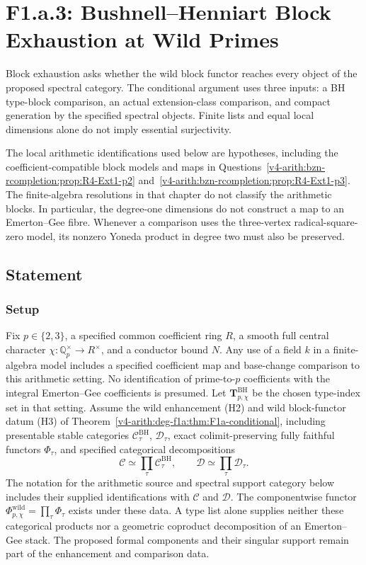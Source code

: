 \chapter{F1.a.3: Bushnell--Henniart Block Exhaustion at Wild Primes}
\label{v4-arith:f1a3-BH}

Block exhaustion asks whether the wild block functor reaches every
object of the proposed spectral category. The conditional argument
uses three inputs: a BH type-block comparison, an actual
extension-class comparison, and compact generation by the specified
spectral objects. Finite lists and equal local dimensions alone do
not imply essential surjectivity.

The local arithmetic identifications used below are hypotheses,
including the coefficient-compatible block models and maps in
Questions~\ref{v4-arith:bzn-rcompletion:prop:R4-Ext1-p2}
and~\ref{v4-arith:bzn-rcompletion:prop:R4-Ext1-p3}.
The finite-algebra resolutions in that chapter do not classify the
arithmetic blocks. In particular, the degree-one dimensions do not
construct a map to an Emerton--Gee fibre. Whenever a comparison
uses the three-vertex radical-square-zero model, its nonzero
Yoneda product in degree two must also be preserved.

\section{Statement}
\label{v4-arith:f1a3-BH:statement}

\subsection{Setup}

Fix \(p\in\{2,3\}\), a specified common coefficient ring \(R\),
a smooth full central character
\(\chi:\mathbb Q_p^\times\to R^\times\), and a conductor bound
\(N\). Any use of a field \(k\) in a finite-algebra model includes
a specified coefficient map and base-change comparison to this
arithmetic setting. No identification of prime-to-\(p\) coefficients
with the integral Emerton--Gee coefficients is presumed.
Let \(\mathbf T^{\mathrm{BH}}_{p,\chi}\) be the chosen type-index
set in that setting. Assume the wild enhancement (H2) and wild
block-functor datum (H3) of
Theorem~\ref{v4-arith:deg-f1a:thm:F1a-conditional}, including
presentable stable categories \(\mathcal C_\tau^{\mathrm{BH}}\),
\(\mathcal D_\tau\), exact colimit-preserving fully faithful
functors \(\Phi_\tau\), and specified categorical decompositions
\[
 \mathcal C\simeq\prod_\tau\mathcal C_\tau^{\mathrm{BH}},
 \qquad \mathcal D\simeq\prod_\tau\mathcal D_\tau.
\]
The notation for the arithmetic source and spectral support category
below includes their supplied identifications with \(\mathcal C\)
and \(\mathcal D\). The componentwise functor
\(\Phi^{\mathrm{wild}}_{p,\chi}=\prod_\tau\Phi_\tau\) exists
under these data. A type list alone supplies neither these
categorical products nor a geometric coproduct decomposition of
an Emerton--Gee stack. The proposed formal components and their
singular support remain part of the enhancement and comparison data.

